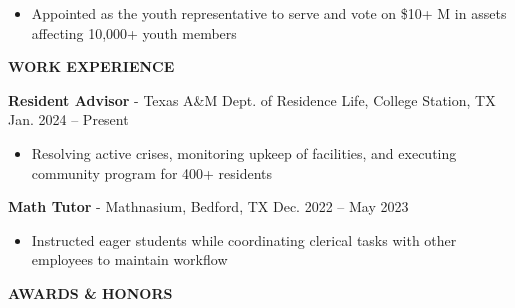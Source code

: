\documentclass[18pt]{article}
\begin{document}
    \vspace{-0.75\baselineskip}
    \begin{itemize}[noitemsep]
        \vspace{-\baselineskip}
        \item Appointed as the youth representative to serve and vote on \$10+ M in assets affecting 10,000+ youth members
        
    \end{itemize}


    \begin{center}
        \vspace{-0.5\baselineskip}
        \textbf{WORK EXPERIENCE}
        \hrulefill
    \end{center}
    \vspace{-0.5\baselineskip}

    \noindent\textbf{Resident Advisor} - Texas A\&M Dept. of Residence Life, College Station, TX \hfill Jan. 2024 – Present \hspace{0pt} %

    \vspace{-.75\baselineskip}
    \begin{itemize}[noitemsep]
        \item Resolving active crises, monitoring upkeep of facilities, and executing community program for 400+ residents
    \end{itemize}

    \vspace{-0.5\baselineskip}
    \textbf{Math Tutor} - Mathnasium, Bedford, TX \hfill Dec. 2022 – May 2023 \hspace{0pt}

    \vspace{-0.75\baselineskip}
    \begin{itemize}[noitemsep]
        \item Instructed eager students while coordinating clerical tasks with other employees to maintain workflow
    \end{itemize}


    \begin{center}
        \vspace{-0.5\baselineskip}
        \textbf{AWARDS \& HONORS}
        \hrulefill
    \end{center}
    \vspace{-0.5\baselineskip}
\end{document}
